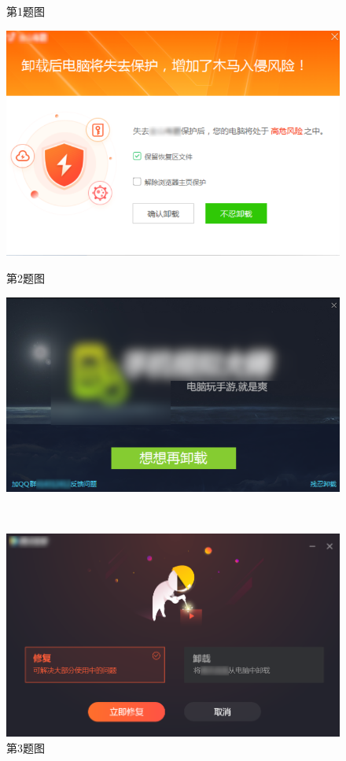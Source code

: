 \begin{enumerate}
\begin{figure}[htb!]
\begin{minipage}{.44\textwidth}
        \caption{第1题图}
        \label{fig:Uninstalling_1}
      \end{minipage}
      \begin{minipage}{.55\textwidth}
        \centering
        \includegraphics[width=.9\textwidth]{assets/basic/Uninstalling_2.png}
        \caption{第2题图}
        \label{fig:Uninstalling_2}
        \includegraphics[width=.95\textwidth]{assets/basic/Uninstalling_3.png}
        \caption{第3题图}
        \label{fig:Uninstalling_3}
      \end{minipage}
      \\
      \begin{minipage}{.6\textwidth}
        \centering
        \includegraphics[width=.95\textwidth]{assets/basic/Uninstalling_4.png}

\end{minipage}
\end{figure}
\end{enumerate}
